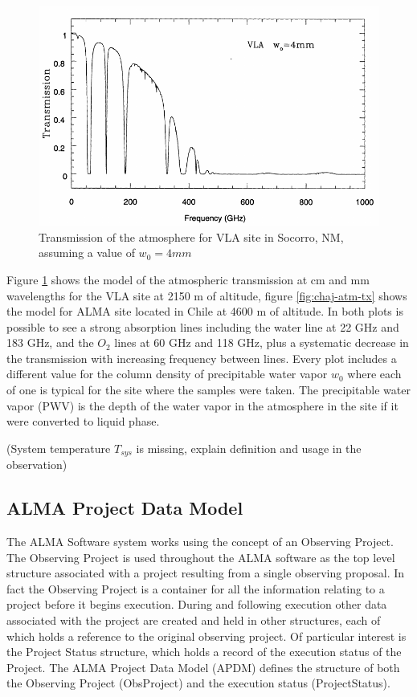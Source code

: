 \documentclass[11pt]{article}
\begin{document}
\begin{figure}[htbp]
\includegraphics[width=\textwidth]{images/vla-atm-transmission}
\caption{Transmission of the atmosphere for VLA site in Socorro, NM, assuming a value of $w_0 = 4 mm$}
\label{fig:vla-atm-tx}
\end{figure}

Figure \ref{fig:vla-atm-tx} shows the model of the atmospheric transmission at cm and mm wavelengths for the VLA site at 2150 m of altitude, figure \ref{fig:chaj-atm-tx} shows the model for ALMA site located in Chile at 4600 m of altitude. In both plots is possible to see a strong absorption lines including the water line at 22 GHz and 183 GHz, and the $O_2$ lines at 60 GHz and 118 GHz, plus a systematic decrease in the transmission with increasing frequency between lines. Every plot includes a different value for the column density of precipitable water vapor $w_0$ where each of one is typical for the site where the samples were taken. The precipitable water vapor (PWV) is the depth of the water vapor in the atmosphere in the site if it were converted to liquid phase.

(System temperature $T_{sys}$ is missing, explain definition and usage in the observation)

\subsection{ALMA Project Data Model}
\label{sec:apdm}
The ALMA Software system works using the concept of an Observing Project. The Observing Project is used throughout the ALMA software as the top level structure associated with a project resulting from a single observing proposal. In fact the Observing Project is a container for all the information relating to a project before it begins execution. During and following execution other data associated with the project are created and held in other structures, each of which holds a reference to the original observing project. Of particular interest is the Project Status structure, which holds a record of the execution status of the Project. The ALMA Project Data Model (APDM) defines the structure of both the Observing Project (ObsProject) and the execution status (ProjectStatus).
\end{document}

